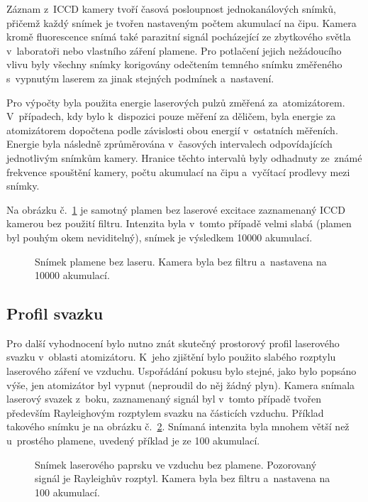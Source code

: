 Záznam z~ICCD kamery tvoří časová posloupnost jednokanálových sním\-ků,
přičemž každý snímek je tvořen nastaveným počtem akumulací na čipu.
Kamera kromě fluorescence snímá také parazitní signál pocházející
ze zbytkového světla v~laboratoři nebo vlastního záření plamene.
Pro potlačení jejich nežádoucího vlivu
byly všechny snímky korigovány odečtením temného snímku změřeného
s~vypnutým laserem za jinak stejných podmínek a~nastavení.

Pro výpočty byla použita energie laserových pulzů změřená za~atomizátorem.
V~případech, kdy bylo k~dispozici pouze měření za děličem,
byla energie za atomizátorem dopočtena podle závislosti obou energií
v~ostatních měřeních.
Energie byla následně zprůměrována v~časových intervalech odpovídajících
jednotlivým snímkům kamery.
Hranice těchto intervalů byly odhadnuty ze~známé frekvence spouštění
kamery, počtu akumulací na čipu a~vyčítací prodlevy mezi sním\-ky.

Na obrázku č.~\ref{fig:lif-flame} je samotný plamen bez laserové excitace
zaznamenaný ICCD kamerou bez použití filtru.
Intenzita byla v~tomto případě velmi slabá
(plamen byl pouhým okem neviditelný),
snímek je výsledkem \num{10000} akumulací.

\begin{figure}[p]
	\centering
	
	\caption{Snímek plamene bez laseru.
		Kamera byla bez filtru a~nastavena na \num{10000} akumulací.}
	\label{fig:lif-flame}
\end{figure}

\subsection{Profil svazku}
\label{sec:lif-rayleigh}
Pro další vyhodnocení bylo nutno znát skutečný prostorový profil
laserového svazku v~oblasti atomizátoru.
K~jeho zjištění bylo použito slabého rozptylu laserového záření ve vzduchu.
Uspořádání pokusu bylo stejné, jako bylo popsáno výše,
jen atomizátor byl vypnut (neproudil do něj žádný plyn).
Kamera snímala laserový svazek z~boku, zaznamenaný signál byl v~tomto
případě tvořen především Rayleighovým rozptylem svazku na částicích vzduchu.
Příklad takového snímku je na obrázku č.~\ref{fig:lif-beam}.
Snímaná intenzita byla mnohem větší než u~prostého plamene,
uvedený příklad je ze \num{100} akumulací.

\begin{figure}[p]
	\centering
	
	\caption{Snímek laserového paprsku ve vzduchu bez plamene.
		Pozorovaný signál je Rayleighův rozptyl.
		Kamera byla bez filtru a~nastavena na \num{100} akumulací.}
	\label{fig:lif-beam}
\end{figure}

